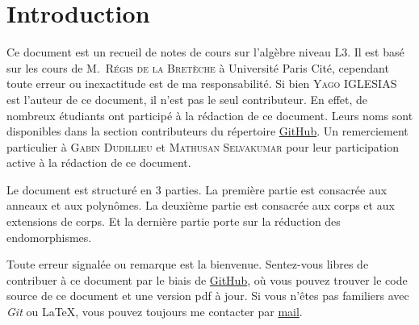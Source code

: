 
\section{Introduction}

Ce document est un recueil de notes de cours sur l'algèbre niveau L3. Il est
basé sur les cours de M.~\textsc{Régis de la Bretèche} à Université Paris Cité, cependant toute 
erreur ou inexactitude est de ma responsabilité.
Si bien \textsc{Yago IGLESIAS} est l'auteur de ce document, il n'est pas
le seul contributeur. En effet, de nombreux étudiants ont participé à la
rédaction de ce document. Leurs noms sont disponibles dans la section
contributeurs du répertoire \href{https://github.com/Yag000/algebre-II-notes/graphs/contributors}{GitHub}.
Un remerciement particulier à \textsc{Gabin Dudillieu} et \textsc{Mathusan Selvakumar} pour leur
participation active à la rédaction de ce document.
\vspace{0.5cm}

Le document est structuré en 3 parties. La première partie est consacrée aux anneaux et aux polynômes.
La deuxième partie est consacrée aux corps et aux extensions de corps. Et la dernière partie porte sur
la réduction des endomorphismes.
\vspace{0.5cm}

Toute erreur signalée ou remarque est la bienvenue. 
Sentez-vous libres de contribuer à ce document par le biais de \href{https://github.com/Yag000/algebre-II-notes}{GitHub}, 
où vous pouvez trouver le code source de ce document et une version pdf à jour.
Si vous n'êtes pas familiers avec \textit{Git} ou \LaTeX, vous pouvez toujours me contacter
par \href{mailto: yago.iglesias.vazquez@gmail.com}{mail}.






